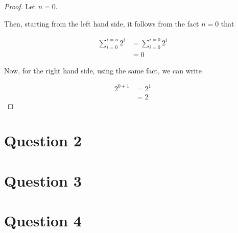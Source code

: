 \documentclass[12pt]{article}
\begin{document}
\begin{enumerate}[a.]
\begin{proof}
        \bigskip

        Let $n = 0$.

        \bigskip

        Then, starting from the left hand side, it follows from the fact $n = 0$ that

        \setcounter{equation}{0}
        \begin{align}
            \sum\limits_{i=0}^{i=n} 2^i &= \sum\limits_{i=0}^{i=0} 2^i\\
            &= 0
        \end{align}


        Now, for the right hand side, using the same fact, we can write

        \begin{align}
            2^{0+1} &= 2^1\\
            &= 2
        \end{align}
    \end{proof}

\end{enumerate}

\bigskip

\section*{Question 2}

\section*{Question 3}

\section*{Question 4}
\end{document}
